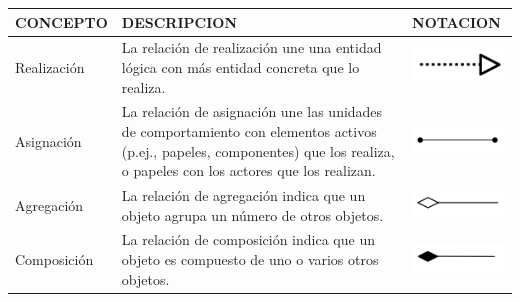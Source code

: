 \begin{table}[H]
	\centering
	\begin{tabular}{| m{4cm} | m{4cm} | m{4cm} | }
		\hline
		\centering\vspace{1.52mm}CONCEPTO & \centering\vspace{1.52mm}DESCRIPCION &\vspace{1.52mm}NOTACION \\
		\hline
		\centering\vspace{1.52mm}Realización & \vspace{1.52mm}La relación de realización une una entidad lógica con más entidad concreta que lo realiza.& \vspace{1.52mm}\includegraphics[width=30mm]{arquitectura/imagenes/44} \\
		\hline
		\centering\vspace{1.52mm}Asignación & \vspace{1.52mm}La relación de asignación une las unidades de comportamiento con elementos activos (p.ej., papeles, componentes) que los realiza, o papeles con los actores que los realizan.& \vspace{1.52mm}\includegraphics[width=30mm]{arquitectura/imagenes/45} \\
		\hline
		\centering\vspace{1.52mm}Agregación & \vspace{1.52mm}La relación de agregación indica que un objeto agrupa un número de otros objetos.& \vspace{1.52mm}\includegraphics[width=30mm]{arquitectura/imagenes/46} \\
		\hline
		\centering\vspace{1.52mm}Composición & \vspace{1.52mm}La relación de composición indica que un objeto es compuesto de uno o varios otros objetos.& \vspace{1.52mm}\includegraphics[width=30mm]{arquitectura/imagenes/47} \\

\end{tabular}
\end{table}
